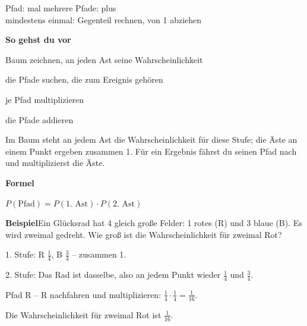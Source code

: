 \documentclass[11pt]{article}
\newcommand{\nr}[1]{\makebox[7mm][l]{\textbf{#1}}}
\begin{document}
\begin{tcolorbox}[colback=mbkasten,colframe=mbgrau,boxrule=0.5pt,arc=1mm,left=3mm,right=3mm,top=2mm,bottom=2mm,title={\bfseries Formel auf einen Blick},coltitle=black,colbacktitle=black!10]
{\Large Pfad: mal \qquad mehrere Pfade: plus \\ mindestens einmal: Gegenteil rechnen, von 1 abziehen}\par\medskip
\textbf{So gehst du vor}\par
\nr{1}Baum zeichnen, an jeden Ast seine Wahrscheinlichkeit\par
\nr{2}die Pfade suchen, die zum Ereignis gehören\par
\nr{3}je Pfad multiplizieren\par
\nr{4}die Pfade addieren\par
\medskip
\end{tcolorbox}
\clearpage\label{s:A}\noindent\colorbox{black!12}{}\hspace{3mm}{\Large\bfseries Baum und Pfadregel}\par\smallskip
\noindent Im Baum steht an jedem Ast die Wahrscheinlichkeit für diese Stufe; die Äste an einem Punkt ergeben zusammen 1. Für ein Ergebnis fährst du seinen Pfad nach und multiplizierst die Äste.\par\medskip
\noindent\textbf{Formel}\par\nopagebreak\noindent\hspace*{4mm}\begin{minipage}{\dimexpr\linewidth-4mm\relax}$P(\text{Pfad}) = P(\text{1. Ast}) \cdot P(\text{2. Ast})$\end{minipage}\par\medskip
\noindent\textbf{Beispiel}\quad Ein Glücksrad hat 4 gleich große Felder: 1 rotes (R) und 3 blaue (B). Es wird zweimal gedreht. Wie groß ist die Wahrscheinlichkeit für zweimal Rot?\par\smallskip
\noindent\begin{minipage}[t]{0.6\linewidth}\vspace{0pt}\par\noindent{}1. Stufe: R $\frac{1}{4}$, B $\frac{3}{4}$ – zusammen 1.\par\smallskip\par\noindent{}2. Stufe: Das Rad ist dasselbe, also an jedem Punkt wieder $\frac{1}{4}$ und $\frac{3}{4}$.\par\smallskip\par\noindent{}Pfad R – R nachfahren und multiplizieren: $\frac{1}{4} \cdot \frac{1}{4} = \frac{1}{16}$.\par\smallskip\par\noindent{}Die Wahrscheinlichkeit für zweimal Rot ist $\frac{1}{16}$.\par\smallskip\end{minipage}\hfill
\end{document}
